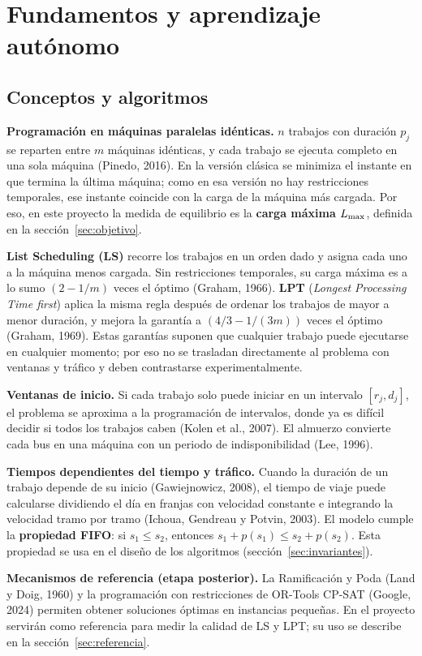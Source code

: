 \section{Fundamentos y aprendizaje autónomo}\label{sec:fundamentos}

\subsection{Conceptos y algoritmos}
\textbf{Programación en máquinas paralelas idénticas.} $n$ trabajos con duración $p_j$ se reparten entre $m$ máquinas idénticas, y cada trabajo se ejecuta completo en una sola máquina (Pinedo, 2016). En la versión clásica se minimiza el instante en que termina la última máquina; como en esa versión no hay restricciones temporales, ese instante coincide con la carga de la máquina más cargada. Por eso, en este proyecto la medida de equilibrio es la \textbf{carga máxima $L_{\max}$}, definida en la sección~\ref{sec:objetivo}.

\textbf{List Scheduling (LS)} recorre los trabajos en un orden dado y asigna cada uno a la máquina menos cargada. Sin restricciones temporales, su carga máxima es a lo sumo $(2 - 1/m)$ veces el óptimo (Graham, 1966). \textbf{LPT} (\emph{Longest Processing Time first}) aplica la misma regla después de ordenar los trabajos de mayor a menor duración, y mejora la garantía a $(4/3 - 1/(3m))$ veces el óptimo (Graham, 1969). Estas garantías suponen que cualquier trabajo puede ejecutarse en cualquier momento; por eso no se trasladan directamente al problema con ventanas y tráfico y deben contrastarse experimentalmente.

\textbf{Ventanas de inicio.} Si cada trabajo solo puede iniciar en un intervalo $[r_j, d_j]$, el problema se aproxima a la programación de intervalos, donde ya es difícil decidir si todos los trabajos caben (Kolen et al., 2007). El almuerzo convierte cada bus en una máquina con un periodo de indisponibilidad (Lee, 1996).

\textbf{Tiempos dependientes del tiempo y tráfico.} Cuando la duración de un trabajo depende de su inicio (Gawiejnowicz, 2008), el tiempo de viaje puede calcularse dividiendo el día en franjas con velocidad constante e integrando la velocidad tramo por tramo (Ichoua, Gendreau y Potvin, 2003). El modelo cumple la \textbf{propiedad FIFO}: si $s_1 \le s_2$, entonces $s_1 + p(s_1) \le s_2 + p(s_2)$. Esta propiedad se usa en el diseño de los algoritmos (sección~\ref{sec:invariantes}).

\textbf{Mecanismos de referencia (etapa posterior).} La Ramificación y Poda (Land y Doig, 1960) y la programación con restricciones de OR-Tools CP-SAT (Google, 2024) permiten obtener soluciones óptimas en instancias pequeñas. En el proyecto servirán como referencia para medir la calidad de LS y LPT; su uso se describe en la sección~\ref{sec:referencia}.

